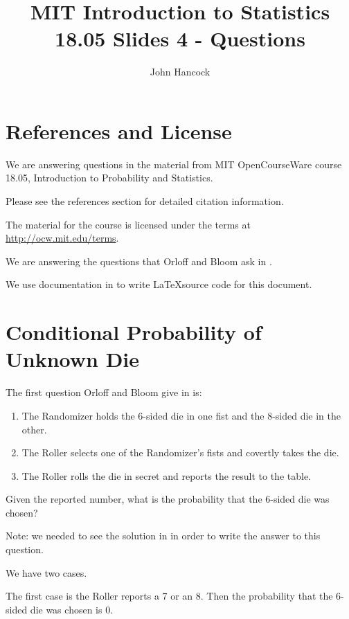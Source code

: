 \documentclass[a4paper,11pt]{article}
\author{John Hancock}
\title{MIT Introduction to Statistics 18.05 Slides 4 - Questions }
\begin{document}
\maketitle
\tableofcontents
\section{References and License}
We are answering questions in the material from MIT OpenCourseWare
course 18.05, Introduction to Probability and Statistics.

Please see the references section for detailed citation information.

The material for the course is licensed under the terms at 
\url{http://ocw.mit.edu/terms}.

We are answering the questions that Orloff and Bloom ask in
\cite{slides4}.

We use documentation in \cite{blockQuote} to write \LaTeX source code
for this document.
 
\section{Conditional Probability of Unknown Die}

The first question Orloff and Bloom give in \cite{slides4} is:
\begin{displayquote}

\begin{enumerate}
  \item The Randomizer holds the 6-sided die in one fist and the 8-sided
  die in the other.

  \item The Roller selects one of the Randomizer’s fists and covertly 
   takes the die.

  \item The Roller rolls the die in secret and reports the result to the
  table.
\end{enumerate}

Given the reported number, what is the probability that the 6-sided die
was chosen? 
\end{displayquote}

Note: we needed to see the solution in \cite{slides4Ans} in order to
write the answer to this question.

We have two cases.

The first case is the Roller reports a 7 or an 8. Then the 
probability that the 6-sided die was chosen is 0.
\end{document}
